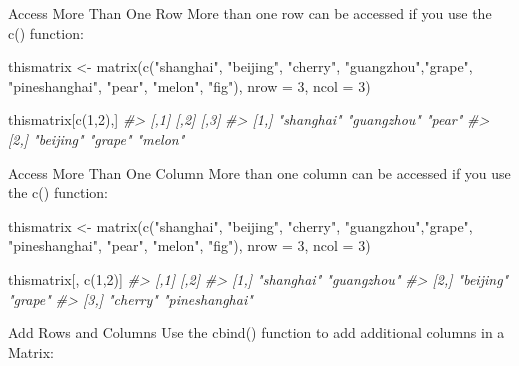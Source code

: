 \documentclass[
]{book}
\newenvironment{Shaded}{\begin{snugshade}}{\end{snugshade}}
\newcommand{\AttributeTok}[1]{\textcolor[rgb]{0.77,0.63,0.00}{#1}}
\newcommand{\CommentTok}[1]{\textcolor[rgb]{0.56,0.35,0.01}{\textit{#1}}}
\newcommand{\DecValTok}[1]{\textcolor[rgb]{0.00,0.00,0.81}{#1}}
\newcommand{\FunctionTok}[1]{\textcolor[rgb]{0.00,0.00,0.00}{#1}}
\newcommand{\NormalTok}[1]{#1}
\newcommand{\OtherTok}[1]{\textcolor[rgb]{0.56,0.35,0.01}{#1}}
\newcommand{\StringTok}[1]{\textcolor[rgb]{0.31,0.60,0.02}{#1}}
\begin{document}
Access More Than One Row
More than one row can be accessed if you use the c() function:

\begin{Shaded}
\begin{Highlighting}[]
\NormalTok{thismatrix }\OtherTok{\textless{}{-}} \FunctionTok{matrix}\NormalTok{(}\FunctionTok{c}\NormalTok{(}\StringTok{"shanghai"}\NormalTok{, }\StringTok{"beijing"}\NormalTok{, }\StringTok{"cherry"}\NormalTok{, }\StringTok{"guangzhou"}\NormalTok{,}\StringTok{"grape"}\NormalTok{, }\StringTok{"pineshanghai"}\NormalTok{, }\StringTok{"pear"}\NormalTok{, }\StringTok{"melon"}\NormalTok{, }\StringTok{"fig"}\NormalTok{), }\AttributeTok{nrow =} \DecValTok{3}\NormalTok{, }\AttributeTok{ncol =} \DecValTok{3}\NormalTok{)}

\NormalTok{thismatrix[}\FunctionTok{c}\NormalTok{(}\DecValTok{1}\NormalTok{,}\DecValTok{2}\NormalTok{),]}
\CommentTok{\#\textgreater{}      [,1]       [,2]        [,3]   }
\CommentTok{\#\textgreater{} [1,] "shanghai" "guangzhou" "pear" }
\CommentTok{\#\textgreater{} [2,] "beijing"  "grape"     "melon"}
\end{Highlighting}
\end{Shaded}

Access More Than One Column
More than one column can be accessed if you use the c() function:

\begin{Shaded}
\begin{Highlighting}[]
\NormalTok{thismatrix }\OtherTok{\textless{}{-}} \FunctionTok{matrix}\NormalTok{(}\FunctionTok{c}\NormalTok{(}\StringTok{"shanghai"}\NormalTok{, }\StringTok{"beijing"}\NormalTok{, }\StringTok{"cherry"}\NormalTok{, }\StringTok{"guangzhou"}\NormalTok{,}\StringTok{"grape"}\NormalTok{, }\StringTok{"pineshanghai"}\NormalTok{, }\StringTok{"pear"}\NormalTok{, }\StringTok{"melon"}\NormalTok{, }\StringTok{"fig"}\NormalTok{), }\AttributeTok{nrow =} \DecValTok{3}\NormalTok{, }\AttributeTok{ncol =} \DecValTok{3}\NormalTok{)}

\NormalTok{thismatrix[, }\FunctionTok{c}\NormalTok{(}\DecValTok{1}\NormalTok{,}\DecValTok{2}\NormalTok{)]}
\CommentTok{\#\textgreater{}      [,1]       [,2]          }
\CommentTok{\#\textgreater{} [1,] "shanghai" "guangzhou"   }
\CommentTok{\#\textgreater{} [2,] "beijing"  "grape"       }
\CommentTok{\#\textgreater{} [3,] "cherry"   "pineshanghai"}
\end{Highlighting}
\end{Shaded}

Add Rows and Columns
Use the cbind() function to add additional columns in a Matrix:
\end{document}
